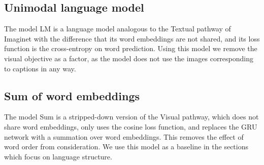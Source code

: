 \subsection{Unimodal language model}
The model {\sc LM} is a language model analogous to the {\sc Textual}
pathway of {\sc Imaginet} with the difference that its word embeddings
are not shared, and its loss function is the cross-entropy on word
prediction. Using this model we remove the visual objective as a
factor, as the model does not use the images corresponding to captions
in any way.

\subsection{Sum of word embeddings}
The model {\sc Sum} is a stripped-down version of the {\sc Visual}
pathway, which does not share word embeddings, only uses the cosine
loss function, and replaces the GRU network with a summation over word
embeddings. This removes the effect of word order from
consideration. We use this model as a baseline in the sections which
focus on language structure. 
